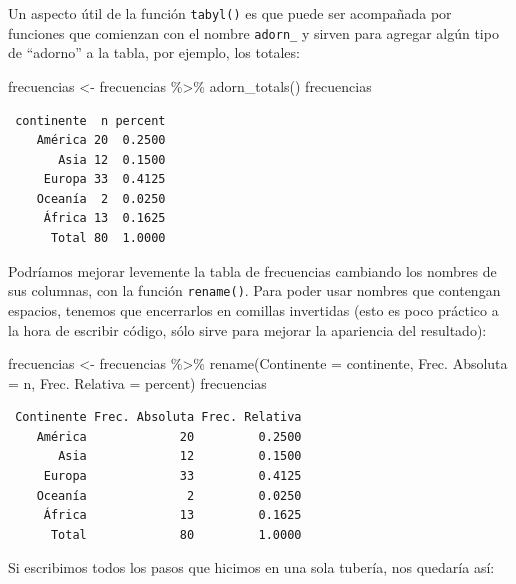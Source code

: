 \documentclass[
]{book}
\newenvironment{Shaded}{\begin{snugshade}}{\end{snugshade}}
\newcommand{\AttributeTok}[1]{\textcolor[rgb]{0.77,0.63,0.00}{#1}}
\newcommand{\FunctionTok}[1]{\textcolor[rgb]{0.00,0.00,0.00}{#1}}
\newcommand{\NormalTok}[1]{#1}
\newcommand{\OtherTok}[1]{\textcolor[rgb]{0.56,0.35,0.01}{#1}}
\newcommand{\SpecialCharTok}[1]{\textcolor[rgb]{0.00,0.00,0.00}{#1}}
\newcommand{\StringTok}[1]{\textcolor[rgb]{0.31,0.60,0.02}{#1}}
\begin{document}
Un aspecto útil de la función \texttt{tabyl()} es que puede ser acompañada por funciones que comienzan con el nombre \texttt{adorn\_} y sirven para agregar algún tipo de ``adorno'' a la tabla, por ejemplo, los totales:

\begin{Shaded}
\begin{Highlighting}[]
\NormalTok{frecuencias }\OtherTok{\textless{}{-}} 
\NormalTok{    frecuencias }\SpecialCharTok{\%\textgreater{}\%} 
    \FunctionTok{adorn\_totals}\NormalTok{()}
\NormalTok{frecuencias}
\end{Highlighting}
\end{Shaded}

\begin{verbatim}
 continente  n percent
    América 20  0.2500
       Asia 12  0.1500
     Europa 33  0.4125
    Oceanía  2  0.0250
     África 13  0.1625
      Total 80  1.0000
\end{verbatim}

Podríamos mejorar levemente la tabla de frecuencias cambiando los nombres de sus columnas, con la función \texttt{rename()}. Para poder usar nombres que contengan espacios, tenemos que encerrarlos en comillas invertidas (esto es poco práctico a la hora de escribir código, sólo sirve para mejorar la apariencia del resultado):

\begin{Shaded}
\begin{Highlighting}[]
\NormalTok{frecuencias }\OtherTok{\textless{}{-}} 
\NormalTok{    frecuencias }\SpecialCharTok{\%\textgreater{}\%} 
    \FunctionTok{rename}\NormalTok{(}\AttributeTok{Continente =}\NormalTok{ continente, }\StringTok{\textasciigrave{}}\AttributeTok{Frec. Absoluta}\StringTok{\textasciigrave{}} \OtherTok{=}\NormalTok{ n, }\StringTok{\textasciigrave{}}\AttributeTok{Frec. Relativa}\StringTok{\textasciigrave{}} \OtherTok{=}\NormalTok{ percent)}
\NormalTok{frecuencias}
\end{Highlighting}
\end{Shaded}

\begin{verbatim}
 Continente Frec. Absoluta Frec. Relativa
    América             20         0.2500
       Asia             12         0.1500
     Europa             33         0.4125
    Oceanía              2         0.0250
     África             13         0.1625
      Total             80         1.0000
\end{verbatim}

Si escribimos todos los pasos que hicimos en una sola tubería, nos quedaría así:
\end{document}
